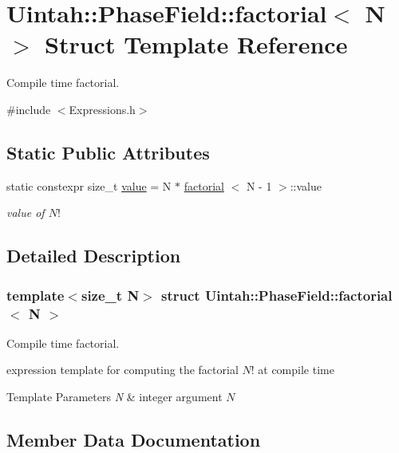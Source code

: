 \hypertarget{structUintah_1_1PhaseField_1_1factorial}{}\section{Uintah\+:\+:Phase\+Field\+:\+:factorial$<$ N $>$ Struct Template Reference}
\label{structUintah_1_1PhaseField_1_1factorial}


Compile time factorial.  




{\ttfamily \#include $<$Expressions.\+h$>$}

\subsection*{Static Public Attributes}
\begin{DoxyCompactItemize}
\item 
static constexpr size\+\_\+t \hyperlink{structUintah_1_1PhaseField_1_1factorial_a73c274f4ee3b6444aa83bb415ba22f3d}{value} = N $\ast$ \hyperlink{structUintah_1_1PhaseField_1_1factorial}{factorial} $<$ N -\/ 1 $>$\+::value
\begin{DoxyCompactList}\small\item\em value of $ N! $ \end{DoxyCompactList}\end{DoxyCompactItemize}


\subsection{Detailed Description}
\subsubsection*{template$<$size\+\_\+t N$>$\newline
struct Uintah\+::\+Phase\+Field\+::factorial$<$ N $>$}

Compile time factorial. 

expression template for computing the factorial $ N! $ at compile time 
\begin{DoxyTemplParams}{Template Parameters}
{\em N} & integer argument $ N $ \\
\hline
\end{DoxyTemplParams}


\subsection{Member Data Documentation}
\mbox{\label{structUintah_1_1PhaseField_1_1factorial_a73c274f4ee3b6444aa83bb415ba22f3d}} 
